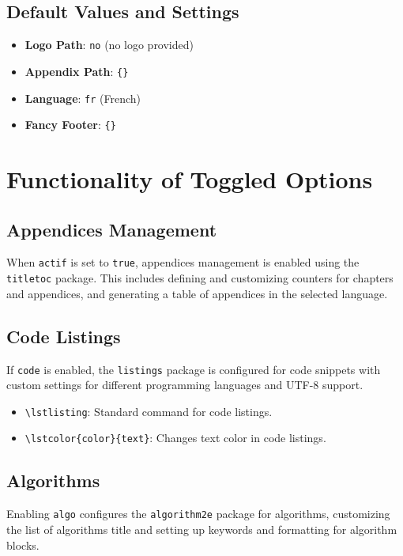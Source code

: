 \documentclass[12pt,twoside]{report}
\begin{document}
\section{Default Values and Settings}
\begin{itemize}
    \item \textbf{Logo Path}: \texttt{no} (no logo provided)
    \item \textbf{Appendix Path}: \texttt{\{\} }
    \item \textbf{Language}: \texttt{fr} (French)
    \item \textbf{Fancy Footer}: \texttt{\{\} }
\end{itemize}

\chapter{Functionality of Toggled Options}

\section{Appendices Management}
When \texttt{actif} is set to \texttt{true}, appendices management is enabled using the \texttt{titletoc} package. This includes defining and customizing counters for chapters and appendices, and generating a table of appendices in the selected language.

\section{Code Listings}
If \texttt{code} is enabled, the \texttt{listings} package is configured for code snippets with custom settings for different programming languages and UTF-8 support.


\begin{itemize}
    \item \verb|\lstlisting|: Standard command for code listings.
    \item \verb|\lstcolor{color}{text}|: Changes text color in code listings.
\end{itemize}


\section{Algorithms}
Enabling \texttt{algo} configures the \texttt{algorithm2e} package for algorithms, customizing the list of algorithms title and setting up keywords and formatting for algorithm blocks.
\end{document}
